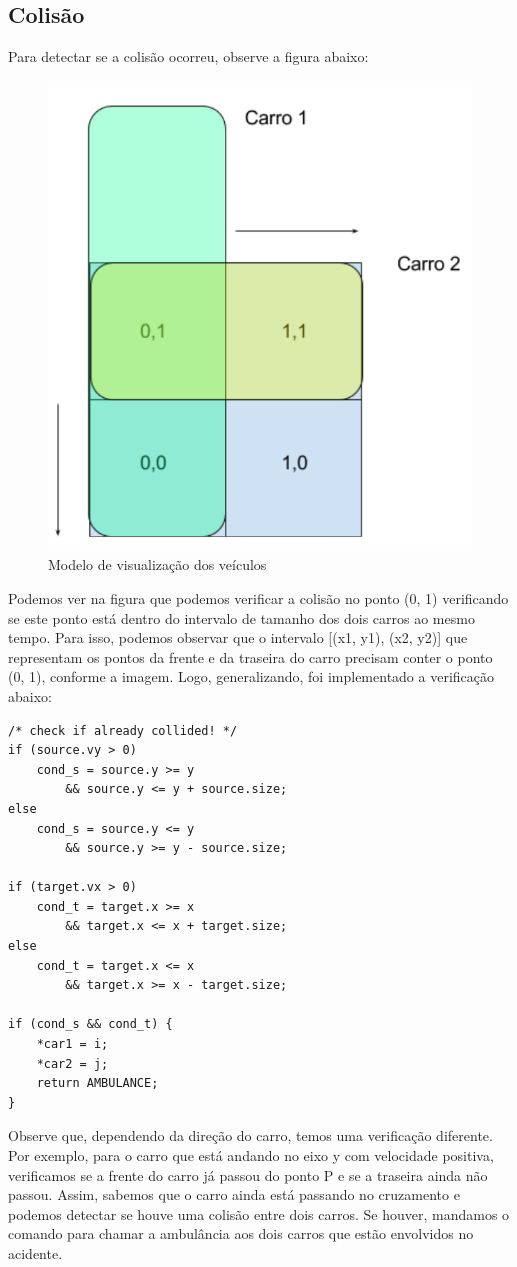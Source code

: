 \documentclass[10pt,twocolumn,letterpaper]{article}
\begin{document}
\subsection{Colisão}
    Para detectar se a colisão ocorreu, observe a figura abaixo:

\begin{figure}[ht!]
    \center\includegraphics[width=.5\hsize]{img/car-vis}
    \caption{Modelo de visualização dos veículos}
\end{figure}

    Podemos ver na figura que podemos verificar a colisão no ponto (0, 1) verificando se este ponto está dentro do intervalo de tamanho dos dois carros ao mesmo tempo. Para isso, podemos observar que o intervalo [(x1, y1), (x2, y2)] que representam os pontos da frente e da traseira do carro precisam conter o ponto (0, 1), conforme a imagem. Logo, generalizando, foi implementado a verificação abaixo:

\begin{lstlisting}[caption={Algoritmo de detecção de colisão (1)}, label=Algorithm]
/* check if already collided! */
if (source.vy > 0)
    cond_s = source.y >= y 
        && source.y <= y + source.size;
else
    cond_s = source.y <= y 
        && source.y >= y - source.size;

if (target.vx > 0)
    cond_t = target.x >= x 
        && target.x <= x + target.size;
else
    cond_t = target.x <= x 
        && target.x >= x - target.size;

if (cond_s && cond_t) {
    *car1 = i;
    *car2 = j;
    return AMBULANCE;
}
\end{lstlisting}

    Observe que, dependendo da direção do carro, temos uma verificação diferente. Por exemplo, para o carro que está andando no eixo y com velocidade positiva, verificamos se a frente do carro já passou do ponto P e se a traseira ainda não passou. Assim, sabemos que o carro ainda está passando no cruzamento e podemos detectar se houve uma colisão entre dois carros. Se houver, mandamos o comando para chamar a ambulância aos dois carros que estão envolvidos no acidente.
    
\end{document}
